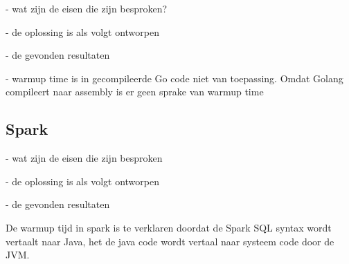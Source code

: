 - wat zijn de eisen die zijn besproken?

- de oplossing is als volgt ontworpen

- de gevonden resultaten

- warmup time is in gecompileerde Go code niet van toepassing.
Omdat Golang compileert naar assembly is er geen sprake van warmup time

\clearpage

\subsection{Spark}

- wat zijn de eisen die zijn besproken

- de oplossing is als volgt ontworpen

- de gevonden resultaten

De warmup tijd in spark is te verklaren doordat de Spark SQL syntax wordt vertaalt naar Java, het de java code wordt vertaal naar systeem code door de JVM.
